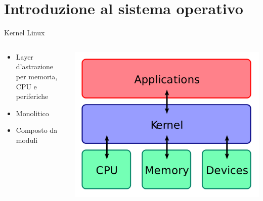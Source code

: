 \documentclass[12pt]{beamer}
\begin{document}
  \section{Introduzione al sistema operativo}
  \begin{frame}[fragile]{Kernel Linux}
    \begin{columns}
    	\begin{column}{0.5\textwidth}
    		\begin{itemize}
    			\item<1> Layer d'astrazione per memoria, CPU e periferiche
    			\item<2> Monolitico
    			\item<3> Composto da moduli
    		\end{itemize}
    	\end{column}
    	\begin{column}{0.5\textwidth}
    		\includegraphics[scale=0.13]{res/Kernel}
    	\end{column}
    \end{columns}
  \end{frame}
\end{document}
